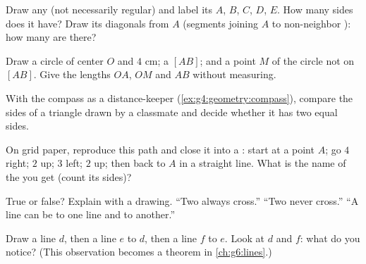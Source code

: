 \begin{exercise}[$\star$]\label{exo:g4:geometry:4}
Draw any  (not necessarily regular) and label its 
$A$, $B$, $C$, $D$, $E$. How many sides does it have? Draw its
diagonals from $A$ (segments joining $A$ to non-neighbor ):
how many are there?
\end{exercise}

\begin{exercise}[$\star$]\label{exo:g4:geometry:5}
Draw a circle of center $O$ and  $4$ cm; a  $[AB]$;
and a point $M$ of the circle not on $[AB]$. Give the lengths $OA$,
$OM$ and $AB$ without measuring.
\end{exercise}

\begin{exercise}[$\star$]\label{exo:g4:geometry:6}
With the compass as a distance-keeper
(\cref{ex:g4:geometry:compass}), compare the sides of a triangle
drawn by a classmate and decide whether it has two equal sides.
\end{exercise}

\begin{exercise}[$\star$]\label{exo:g4:geometry:7}
On grid paper, reproduce this path and close it into a :
start at a point $A$; go $4$ right; $2$ up; $3$ left; $2$ up;
then back to $A$ in a straight line. What is the name of the 
you get (count its sides)?
\end{exercise}

\begin{exercise}[$\star$]\label{exo:g4:geometry:8}
True or false? Explain with a drawing.
``Two  always cross.''
``Two  never cross.''
``A line can be  to one line and  to
another.''
\end{exercise}

\begin{exercise}[$\star\star$]\label{exo:g4:geometry:9}
Draw a line $d$, then a line $e$  to $d$, then a line
$f$  to $e$. Look at $d$ and $f$: what do you notice?
(This observation becomes a theorem in \cref{ch:g6:lines}.)
\end{exercise}

